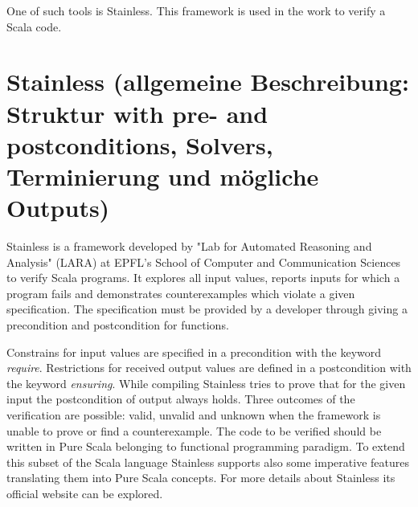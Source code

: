 One of such tools is Stainless. This framework is used in the work to verify a Scala code.

 


\section{Stainless (allgemeine Beschreibung: Struktur with pre- and postconditions, Solvers, Terminierung und mögliche Outputs)}
\label{sec:stainless}


Stainless is a framework developed by "Lab for Automated Reasoning and Analysis" (LARA) at EPFL's School of Computer and Communication Sciences to verify Scala programs.
It explores all input values, reports inputs for which a program fails and demonstrates counterexamples which violate a given specification.
The specification must be provided by a developer through giving a precondition and postcondition for functions. 

Constrains for input values are specified in a precondition with the keyword \textit{require}. 
Restrictions for received output values are defined in a postcondition with the keyword \textit{ensuring}. 
While compiling Stainless tries to prove that for the given input the postcondition of output always holds.
Three outcomes of the verification are possible: valid, unvalid and unknown when the framework is unable to prove or find a counterexample.
The code to be verified should be written in Pure Scala belonging to functional programming paradigm. To extend this subset of the Scala language Stainless supports also some imperative features translating them into Pure Scala concepts.
For more details about Stainless its official website can be explored. \cite{Stainless}



